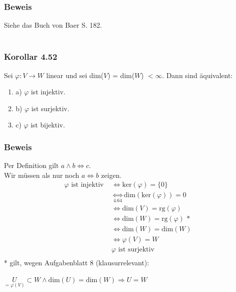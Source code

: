 \documentclass{article}
\begin{document}
\subsubsection*{Beweis}
Siehe das Buch von Baer S. 182. \\
\\
\subsubsection*{Korollar 4.52}
Sei $\varphi: V \rightarrow W$ linear und sei dim($V$) = dim($W$) $< \infty$. Dann sind äquivalent: \\
\begin{enumerate}
    \item a) $\varphi$ ist injektiv. \\
    \item b) $\varphi$ ist surjektiv. \\
    \item c) $\varphi$ ist bijektiv. \\
\end{enumerate}
\subsubsection*{Beweis}
Per Definition gilt $a \wedge b \Leftrightarrow c$. \\
Wir müssen als nur noch $a \Leftrightarrow b$ zeigen. \\
\begin{align*}
    \varphi \text{ ist injektiv } &\Leftrightarrow \text{ker}(\varphi) = \{0\} \\
    &\underset{4.64}{\Leftrightarrow} \text{dim}(\text{ker}(\varphi)) = 0 \\
    &\Leftrightarrow \text{dim}(V) = \text{rg}(\varphi) \\
    &\Leftrightarrow \text{dim}(W) = \text{rg}(\varphi) \text{ * } \\
    &\Leftrightarrow \text{dim}(W) = \text{dim}(W) \\
    &\Leftrightarrow \varphi(V) = W \\  
    &\varphi \text{ ist surjektiv} \\
\end{align*}
* gilt, wegen Aufgabenblatt 8 (klausurrelevant): \\
\begin{center}
    $\underset{= \varphi(V)}{U} \subset W \wedge \text{dim}(U) = \text{dim}(W) \Rightarrow U = W$ \\
\end{center}
\end{document}
